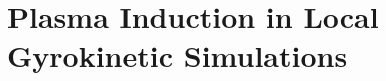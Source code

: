 
\chapter{Plasma Induction in Local Gyrokinetic Simulations}
\label{chap:methods}

\thispagestyle{empty}
\newpage